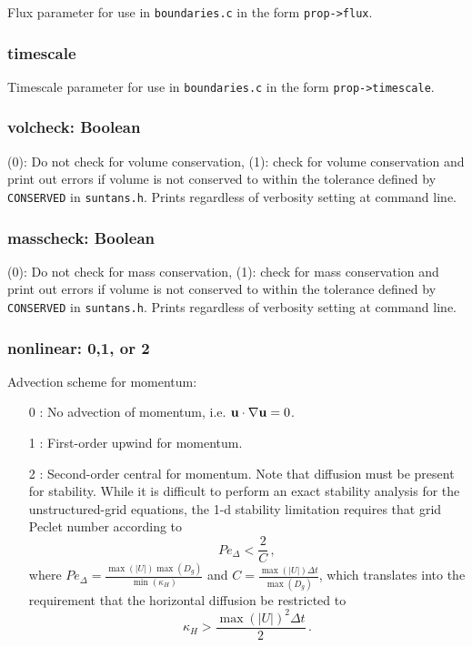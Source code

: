 \documentclass[12pt,oneside]{article}
\begin{document}
Flux parameter for use in \verb+boundaries.c+ in the form \verb+prop->flux+.

\subsubsection{timescale}

Timescale parameter for use in \verb+boundaries.c+ in the form \verb+prop->timescale+.

\subsubsection{volcheck: Boolean}

(0): Do not check for volume conservation, (1): check for volume conservation and print out errors
if volume is not conserved to within the tolerance defined by \verb+CONSERVED+ in \verb+suntans.h+.
Prints regardless of verbosity setting at command line.

\subsubsection{masscheck: Boolean}

(0): Do not check for mass conservation, (1): check for mass conservation and print out errors
if volume is not conserved to within the tolerance defined by \verb+CONSERVED+ in \verb+suntans.h+.
Prints regardless of verbosity setting at command line.

\subsubsection{nonlinear: 0,1, or 2}

Advection scheme for momentum:
\begin{enumerate}
\item[0]: No advection of momentum, i.e. $\mathbf{u}\cdot\nabla\mathbf{u}=0$.
\item[1]: First-order upwind for momentum.
\item[2]: Second-order central for momentum.  Note that diffusion must be present for stability.  While
it is difficult to perform an exact stability analysis for the unstructured-grid equations, the 1-d
stability limitation requires that 
grid Peclet number according to 
\[
Pe_\Delta<\frac{2}{C}\,,
\]
where $Pe_\Delta = \frac{\max(|U|)\max(D_g)}{\min(\kappa_H)}$ and $C=\frac{\max(|U|)\Delta t}{\max(D_g)}$,
which translates into the requirement that the horizontal diffusion be restricted to
\[
\kappa_H>\frac{\max(|U|)^2\Delta t}{2}\,.
\]

\end{enumerate}
\end{document}
